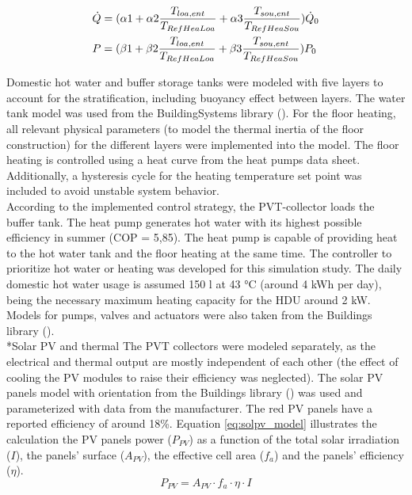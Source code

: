 \documentclass[twocolumn, a4paper,10pt]{article}
\makeatletter
\renewcommand\subsection{\@startsection{subsection}{1}{\z@}{\z@}{\z@}{\normalfont\normalsize\bfseries}}
\renewcommand\subsection{\@startsection{subsection}{1}{\z@}{\z@}{0.1pt}{\normalfont\normalsize\bfseries}}
\makeatother
\begin{document}
\begin{equation}
\begin{aligned}
\vspace{-3pt}
    &\dot{Q} = (\alpha1 + \alpha2 \frac{T_{loa,ent}}{T_{RefHeaLoa}} + \alpha3 \frac{T_{sou,ent}}{T_{RefHeaSou}}) \dot{Q}_0 \\
    &P= (\beta1 + \beta2 \frac{T_{loa,ent}}{T_{RefHeaLoa}} + \beta3 \frac{T_{sou,ent}}{T_{RefHeaSou}}) P_0
\label{eq:HPmodel}
\end{aligned}
\end{equation}

Domestic hot water and buffer storage tanks were modeled with five layers to account for the stratification, including buoyancy effect between layers. The water tank model was used from the BuildingSystems library (\citet{NytschGeusen2012}). For the floor heating, all relevant physical parameters (to model the thermal inertia of the floor construction) for the different layers were implemented into the model. The floor heating is controlled using a heat curve from the heat pumps data sheet. Additionally, a hysteresis cycle for the heating temperature set point was included to avoid unstable system behavior.\\
According to the implemented control strategy, the PVT-collector loads the buffer tank. The heat pump generates hot water with its highest possible efficiency in summer (COP = 5,85). The heat pump is capable of providing heat to the hot water tank and the floor heating at the same time. The controller to prioritize hot water or heating was developed for this simulation study. The daily domestic hot water usage is assumed 150 l at 43 °C (around 4 kWh per day), being the necessary maximum heating capacity for the HDU around 2 kW. Models for pumps, valves and actuators were also taken from the Buildings library (\citet{Wetter2014}).\\

\subsection*{Solar PV and thermal}
The PVT collectors were modeled separately, as the electrical and thermal output are mostly independent of each other (the effect of cooling the PV modules to raise their efficiency was neglected). The solar PV panels model with orientation from the Buildings library (\citet{Wetter2014}) was used and parameterized with data from the manufacturer. The red PV panels have a reported efficiency of around 18\%. Equation \ref{eq:solpv_model} illustrates the calculation the PV panels power ($P_{PV}$) as a function of the total solar irradiation ($I$), the panels' surface ($A_{PV}$), the effective cell area ($f_a$) and the panels' efficiency ($\eta$).\\
\vspace{-1pt}
\begin{equation}
P_{PV} = A_{PV} \cdot  f_{a} \cdot \eta \cdot I
\label{eq:solpv_model}
\end{equation}
\end{document}

